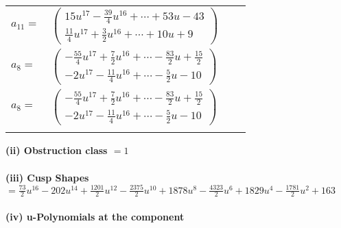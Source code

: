 \documentclass[1p]{elsarticle_modified}
\theoremstyle{definition}
\begin{document}
\begin{tabular}{m{7pt} m{180pt} m{7pt} m{180pt} }
\flushright $a_{11}=$&$\begin{pmatrix}15 u^{17}-\frac{39}{4} u^{16}+\cdots+53 u-43\\\frac{11}{4} u^{17}+\frac{3}{2} u^{16}+\cdots+10 u+9\end{pmatrix}$ \\
\flushright $a_{8}=$&$\begin{pmatrix}-\frac{55}{4} u^{17}+\frac{7}{2} u^{16}+\cdots-\frac{83}{2} u+\frac{15}{2}\\-2 u^{17}-\frac{11}{4} u^{16}+\cdots-\frac{5}{2} u-10\end{pmatrix}$\\ \flushright $a_{8}=$&$\begin{pmatrix}-\frac{55}{4} u^{17}+\frac{7}{2} u^{16}+\cdots-\frac{83}{2} u+\frac{15}{2}\\-2 u^{17}-\frac{11}{4} u^{16}+\cdots-\frac{5}{2} u-10\end{pmatrix}$\\&\end{tabular}
\flushleft \textbf{(ii) Obstruction class $= 1$}\\~\\
\flushleft \textbf{(iii) Cusp Shapes $= \frac{73}{2} u^{16}-202 u^{14}+\frac{1201}{2} u^{12}-\frac{2375}{2} u^{10}+1878 u^8-\frac{4323}{2} u^6+1829 u^4-\frac{1781}{2} u^2+163$}\\~\\
\newpage\renewcommand{\arraystretch}{1}
\flushleft \textbf{(iv) u-Polynomials at the component}\newline \\
\end{document}
